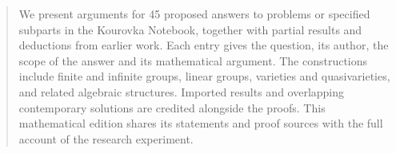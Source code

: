 \begin{abstract}
We present arguments for 45 proposed answers to problems or specified
subparts in the Kourovka Notebook, together with partial results and
deductions from earlier work. Each entry gives the question, its author,
the scope of the answer and its mathematical argument. The constructions
include finite and infinite groups, linear groups, varieties and
quasivarieties, and related algebraic structures. Imported results and
overlapping contemporary solutions are credited alongside the proofs.
This mathematical edition shares its statements and proof sources with
the full account of the research experiment.
\end{abstract}
